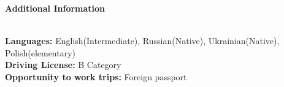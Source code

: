 \documentclass[letterpaper]{article}
\renewcommand{\section}[1]{
  {
    \large \colorbox{my-gray}{
      \begin{minipage}
        {\textwidth-0.175in}
        {\textbf{#1 \vphantom{p\^{E}}}}
      \end{minipage}
    }
  }
}
\begin{document}
\section{Additional Information}
\vspace*{1em}\\
\textbf{Languages:}  English(Intermediate), Russian(Native), Ukrainian(Native), Polish(elementary)\\
\textbf{Driving License:} B Category\\
\textbf{Opportunity to work trips:} Foreign passport\\
\end{document}
